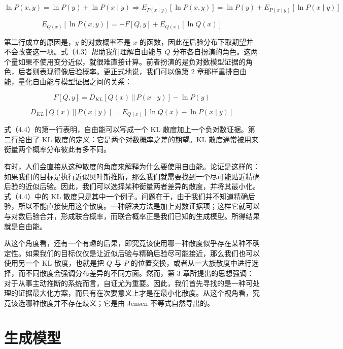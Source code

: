 \begin{equation}
\ln P(x, y) = \ln P(y) + \ln P(x \mid y)
\Rightarrow
E_{P(x \mid y)}[\ln P(x, y)]
= \ln P(y) + E_{P(x \mid y)}[\ln P(x \mid y)]
\tag{4.3}
\end{equation}

\begin{equation}
E_{Q(x)}[\ln P(x, y)] = -F[Q, y] + E_{Q(x)}[\ln Q(x)]
\tag{4.3}
\end{equation}

第二行成立的原因是，$y$ 的对数概率不是 $x$ 的函数，因此在后验分布下取期望并不会改变这一项。式（4.3）帮助我们理解自由能与 $Q$ 分布各自扮演的角色。这两个量如果不使用变分近似，就很难直接计算。前者扮演的是负对数模型证据的角色，后者则表现得像后验概率。更正式地说，我们可以像第 2 章那样重排自由能，量化自由能与模型证据之间的关系：

\begin{equation}
F[Q, y] = D_{KL}[Q(x)\,||\,P(x \mid y)] - \ln P(y)
\tag{4.4}
\end{equation}

\begin{equation}
D_{KL}[Q(x)\,||\,P(x \mid y)]
= E_{Q(x)}\!\left[\ln Q(x) - \ln P(x \mid y)\right]
\tag{4.4}
\end{equation}

式（4.4）的第一行表明，自由能可以写成一个 KL 散度加上一个负对数证据。第二行给出了 KL 散度的定义：它是两个对数概率之差的期望。KL 散度通常被用来衡量两个概率分布彼此有多不同。

有时，人们会直接从这种散度的角度来解释为什么要使用自由能。论证是这样的：如果我们的目标是执行近似贝叶斯推断，那么我们就需要找到一个尽可能贴近精确后验的近似后验。因此，我们可以选择某种衡量两者差异的散度，并将其最小化。式（4.4）中的 KL 散度只是其中一个例子。问题在于，由于我们并不知道精确后验，所以不能直接使用这个散度。一种解决方法是加上对数证据项；这样它就可以与对数后验合并，形成联合概率，而联合概率正是我们已知的生成模型。所得结果就是自由能。

从这个角度看，还有一个有趣的后果，即究竟该使用哪一种散度似乎存在某种不确定性。如果我们的目标仅仅是让近似后验与精确后验尽可能接近，那么我们也可以使用另一个 KL 散度，也就是把 $Q$ 与 $P$ 的位置交换，或者从一大族散度中进行选择，而不同散度会强调分布差异的不同方面。然而，第 3 章所提出的思想强调：对于从事主动推断的系统而言，自证尤为重要。因此，我们首先寻找的是一种可处理的证据最大化方案，而只有在次要意义上才是在最小化散度。从这个视角看，究竟该选哪种散度并不存在歧义；它是由 Jensen 不等式自然导出的。

\section{生成模型}

